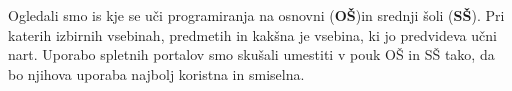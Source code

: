 
Ogledali smo is kje se uči programiranja na osnovni (\textbf{OŠ})in
srednji šoli (\textbf{SŠ}). Pri katerih izbirnih vsebinah, predmetih
in kakšna je vsebina, ki jo predvideva učni nart. Uporabo spletnih
portalov smo skušali umestiti v pouk OŠ in SŠ tako, da bo njihova
uporaba najbolj koristna in smiselna.



